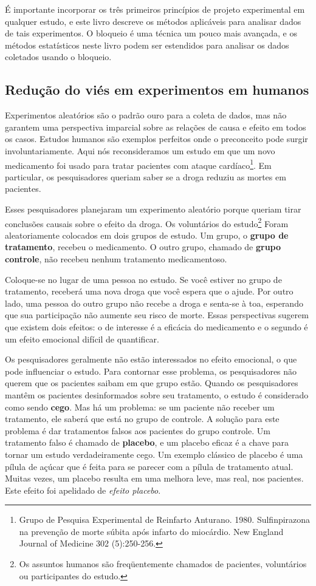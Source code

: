 \documentclass[
]{book}
\theoremstyle{definition}
\theoremstyle{definition}
\theoremstyle{definition}
\theoremstyle{definition}
\theoremstyle{remark}
\begin{document}
É importante incorporar os três primeiros princípios de projeto experimental em qualquer estudo, e este livro descreve os métodos aplicáveis para analisar dados de tais experimentos. O bloqueio é uma técnica um pouco mais avançada, e os métodos estatísticos neste livro podem ser estendidos para analisar os dados coletados usando o bloqueio.

\hypertarget{biasInHumanExperiments}{%
\subsection{Redução do viés em experimentos em humanos}\label{biasInHumanExperiments}}

Experimentos aleatórios são o padrão ouro para a coleta de dados, mas não garantem uma perspectiva imparcial sobre as relações de causa e efeito em todos os casos. Estudos humanos são exemplos perfeitos onde o preconceito pode surgir involuntariamente. Aqui nós reconsideramos um estudo em que um novo medicamento foi usado para tratar pacientes com ataque cardíaco\footnote{Grupo de Pesquisa Experimental de Reinfarto Anturano. 1980. Sulfinpirazona na prevenção de morte súbita após infarto do miocárdio. New England Journal of Medicine 302 (5):250-256.}. Em particular, os pesquisadores queriam saber se a droga reduziu as mortes em pacientes.

Esses pesquisadores planejaram um experimento aleatório porque queriam tirar conclusões causais sobre o efeito da droga. Os voluntários do estudo\footnote{Os assuntos humanos são freqüentemente chamados de pacientes, voluntários ou participantes do estudo.} Foram aleatoriamente colocados em dois grupos de estudo. Um grupo, o \textbf{grupo de tratamento}, recebeu o medicamento. O outro grupo, chamado de \textbf{grupo controle}, não recebeu nenhum tratamento medicamentoso.

Coloque-se no lugar de uma pessoa no estudo. Se você estiver no grupo de tratamento, receberá uma nova droga que você espera que o ajude. Por outro lado, uma pessoa do outro grupo não recebe a droga e senta-se à toa, esperando que sua participação não aumente seu risco de morte. Essas perspectivas sugerem que existem dois efeitos: o de interesse é a eficácia do medicamento e o segundo é um efeito emocional difícil de quantificar.

Os pesquisadores geralmente não estão interessados no efeito emocional, o que pode influenciar o estudo. Para contornar esse problema, os pesquisadores não querem que os pacientes saibam em que grupo estão. Quando os pesquisadores mantêm os pacientes desinformados sobre seu tratamento, o estudo é considerado como sendo \textbf{cego}. Mas há um problema: se um paciente não receber um tratamento, ele saberá que está no grupo de controle. A solução para este problema é dar tratamentos falsos aos pacientes do grupo controle. Um tratamento falso é chamado de \textbf{placebo}, e um placebo eficaz é a chave para tornar um estudo verdadeiramente cego. Um exemplo clássico de placebo é uma pílula de açúcar que é feita para se parecer com a pílula de tratamento atual. Muitas vezes, um placebo resulta em uma melhora leve, mas real, nos pacientes. Este efeito foi apelidado de \emph{efeito placebo}.
\end{document}
